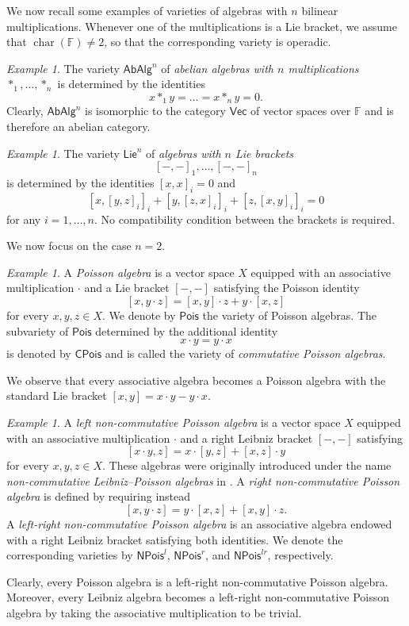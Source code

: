 \documentclass[reqno,a4paper]{amsart}
\theoremstyle{plain}
\theoremstyle{definition}
\theoremstyle{remark}
\newtheorem{example}[subsection]{Example}
\numberwithin{equation}{section}
\newcommand{\F}{\mathbb{F}}
\DeclareMathOperator{\bchar}{char}
\newcommand{\Lie}{\ensuremath{\mathsf{Lie}}}
\newcommand{\Pois}{\ensuremath{\mathsf{Pois}}}
\newcommand{\CPois}{\ensuremath{\mathsf{CPois}}}
\newcommand{\AbAlg}{\ensuremath{\mathsf{AbAlg}}}
\newcommand{\Vect}{\ensuremath{\mathsf{Vec}}}
\newcommand{\NP}{\ensuremath{\mathsf{NPois}}}
\begin{document}
We now recall some examples of varieties of algebras with $n$ bilinear multiplications. Whenever one of the multiplications is a Lie bracket, we assume that $\bchar(\F)\neq2$, so that the corresponding variety is operadic.

\begin{example}
The variety $\AbAlg^n$ of \emph{abelian algebras with $n$ multiplications} $\ast_1,\ldots,\ast_n$ is determined by the identities
\[
x \ast_1 y=\ldots=x \ast_n y=0.
\]
Clearly, $\AbAlg^n$ is isomorphic to the category $\Vect$ of vector spaces over $\F$ and is therefore an abelian category.
\end{example}

\begin{example}
The variety $\Lie^n$ of \emph{algebras with $n$ Lie brackets}
\[
[-,-]_1,\ldots,[-,-]_n
\]
is determined by the identities $[x,x]_i=0$ and
\[
[x,[y,z]_i]_i+[y,[z,x]_i]_i+[z,[x,y]_i]_i=0
\]
for any $i=1,\ldots,n$. No compatibility condition between the brackets is required.
\end{example}

We now focus on the case $n=2$.

\begin{example}\label{ExamplePoissonVariety}
A \emph{Poisson algebra} is a vector space $X$ equipped with an associative multiplication $\cdot$
and a Lie bracket $[-,-]$ satisfying the Poisson identity
\[
[x,y\cdot z]=[x,y]\cdot z+y\cdot[x,z]
\]
for every $x,y,z\in X$. We denote by $\Pois$ the variety of Poisson algebras. The subvariety of $\Pois$ determined by the additional identity
\[
x\cdot y=y\cdot x
\]
is denoted by $\CPois$ and is called the variety of \emph{commutative Poisson algebras}.

We observe that every associative algebra becomes a Poisson algebra with the standard Lie bracket $[x,y]=x \cdot y - y \cdot x$.
\end{example}

\begin{example}\cite{CasasDatuashviliLadraNPLR}\label{ExampleNoncommutativePoisson}
A \emph{left non-commutative Poisson algebra} is a vector space $X$ equipped with an associative multiplication $\cdot$ and a right Leibniz bracket $[-,-]$ satisfying
\[
[x\cdot y,z]=x\cdot[y,z]+[x,z]\cdot y
\]
for every $x,y,z\in X$. These algebras were originally introduced under the name \emph{non-commutative Leibniz--Poisson algebras} in \cite{CasasDatuashviliNLP}. A \emph{right non-commutative Poisson algebra} is defined by requiring instead
\[
[x,y\cdot z]=y\cdot[x,z]+[x,y]\cdot z.
\]
A \emph{left-right non-commutative Poisson algebra} is an associative algebra endowed with a right Leibniz bracket satisfying both identities. We denote the corresponding varieties by $\NP^{l}$, $\NP^{r}$, and $\NP^{lr}$, respectively.

Clearly, every Poisson algebra is a left-right non-commutative Poisson algebra. Moreover, every Leibniz algebra becomes a left-right non-commutative Poisson algebra by taking the associative multiplication to be trivial.
\end{example}
\end{document}
